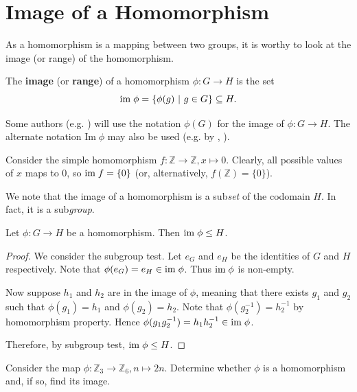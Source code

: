 \section{Image of a Homomorphism}
As a homomorphism is a mapping between two groups, it is worthy to look at the image (or range) of the homomorphism.
\begin{definition}
    The \textbf{image} (or \textbf{range}) of a homomorphism $\phi: G \to H$ is the set
    \[
        \mathrm{im}\;\phi = \{\phi(g) \ | \ g \in G\} \subseteq H.
    \]
\end{definition}
\begin{remark}
    Some authors (e.g. \cite{libretexts_imandker}) will use the notation $\phi(G)$ for the image of $\phi: G \to H$. The alternate notation $\mathrm{Im}\;\phi$ may also be used (e.g. by \cite{clark_1984}, \cite{hungerford_1980}).
\end{remark}

\begin{example}
    Consider the simple homomorphism $f: \mathbb{Z} \to \mathbb{Z}, x \mapsto 0$. Clearly, all possible values of $x$ maps to 0, so $\mathrm{im}\; f = \{0\}$ (or, alternatively, $f(\mathbb{Z}) = \{0\}$).
\end{example}

We note that the image of a homomorphism is a sub\textit{set} of the codomain $H$. In fact, it is a sub\textit{group}.
\begin{proposition}\label{prop-image-is-subgroup-of-codomain}
    Let $\phi: G \to H$ be a homomorphism. Then $\mathrm{im}\;\phi \leq H$.
\end{proposition}
\begin{proof}
    We consider the subgroup test. Let $e_G$ and $e_H$ be the identities of $G$ and $H$ respectively. Note that $\phi(e_G) = e_H \in \mathrm{im}\;\phi$. Thus $\mathrm{im}\;\phi$ is non-empty.

    Now suppose $h_1$ and $h_2$ are in the image of $\phi$, meaning that there exists $g_1$ and $g_2$ such that $\phi(g_1) = h_1$ and $\phi(g_2) = h_2$. Note that $\phi(g_2^{-1}) = h_2^{-1}$ by homomorphism property. Hence $\phi(g_1g_2^{-1}) = h_1h_2^{-1} \in \mathrm{im}\;\phi$.

    Therefore, by subgroup test, $\mathrm{im}\;\phi \leq H$.
\end{proof}

\begin{exercise}
    Consider the map $\phi: \mathbb{Z}_3 \to \mathbb{Z}_6, n \mapsto 2n$. Determine whether $\phi$ is a homomorphism and, if so, find its image.
\end{exercise}

